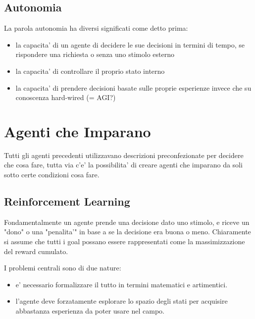 
\subsection{Autonomia}

La parola autonomia ha diversi significati come detto prima:

\begin{itemize}
  \item la capacita' di un agente di decidere le sue decisioni in termini di tempo, se rispondere una richiesta o senza uno stimolo esterno
  \item la capacita' di controllare il proprio stato interno
  \item la capacita' di prendere decisioni basate sulle proprie esperienze invece che su conoscenza hard-wired (= AGI?)
\end{itemize}

\section{Agenti che Imparano}

Tutti gli agenti precedenti utilizzavano descrizioni preconfezionate per decidere che cosa fare, tutta via c'e' la possibilita' di creare agenti che imparano da soli sotto certe condizioni cosa fare.


\subsection{Reinforcement Learning}

Fondamentalmente un agente prende una decisione dato uno stimolo, e riceve un "dono" o una "penalita'" in base a se la decisione era buona o meno.
Chiaramente si assume che tutti i goal possano essere rappresentati come la massimizzazione del reward cumulato.


I problemi centrali sono di due nature:

\begin{itemize}
  \item e' necessario formalizzare il tutto in termini matematici e artimentici.
  \item l'agente deve forzatamente esplorare lo spazio degli stati per acquisire abbastanza esperienza da poter usare nel campo.
\end{itemize}

